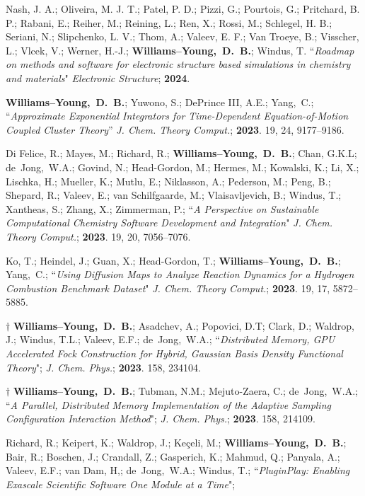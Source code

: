 \documentclass[10pt]{res} %
\newcommand*\me[0]{{\bf Williams--Young,~D.~B.}}
\newcommand*\cy[0]{Yang,~C.}
\newcommand*\bdj[0]{de~Jong,~W.A.}
\begin{document}
\begin{resume}
\begin{etaremune}
        Nash, J. A.; Oliveira, M. J. T.; Patel, P. D.; Pizzi, G.; Pourtois, G.; Pritchard, B. P.; Rabani, E.; 
        Reiher, M.; Reining, L.; Ren, X.; Rossi, M.; Schlegel, H. B.; Seriani, N.; Slipchenko, L. V.; Thom, A.; 
        Valeev, E. F.; Van Troeye, B.; Visscher, L.; Vlcek, V.; Werner, H.-J.; \me; Windus, T.
        ``\emph{Roadmap on methods and software for electronic structure based simulations in chemistry and materials}"
        \emph{Electronic Structure}; \textbf{2024}. 
  \item \me; Yuwono, S.; DePrince III, A.E.; \cy; 
        ``\emph{Approximate Exponential Integrators for Time-Dependent Equation-of-Motion Coupled Cluster Theory}”
	\emph{J. Chem. Theory Comput.}; \textbf{2023}. 19, 24, 9177–9186.
  \item Di Felice, R.; Mayes, M.; Richard, R.; \me; Chan, G.K.L; \bdj; 
        Govind, N.; Head-Gordon, M.; Hermes, M.; Kowalski, K.; Li, X.; Lischka, H.; Mueller, K.; 
	Mutlu, E.; Niklasson, A.; Pederson, M.; Peng, B.; Shepard, R.; Valeev, E.; van Schilfgaarde, M.; 
	Vlaisavljevich, B.; Windus, T.; Xantheas, S.; Zhang, X.; Zimmerman, P.;
	``\emph{A Perspective on Sustainable Computational Chemistry Software Development and Integration}"
	\emph{J. Chem. Theory Comput.}; \textbf{2023}. 19, 20, 7056–7076.
  \item Ko, T.; Heindel, J.; Guan, X.;  Head-Gordon, T.; \me; \cy; 
        ``\emph{Using Diffusion Maps to Analyze Reaction Dynamics for a Hydrogen Combustion Benchmark Dataset}"
        \emph{J. Chem. Theory Comput.}; \textbf{2023}. 19, 17, 5872–5885.
  \item $\dagger$ \me; Asadchev, A.; Popovici, D.T; Clark, D.; Waldrop, J.; Windus, T.L.;
        Valeev, E.F.; \bdj;
        ``\emph{Distributed Memory, GPU Accelerated Fock Construction for Hybrid, Gaussian 
                Basis Density Functional Theory}";
        \emph{J. Chem. Phys.}; \textbf{2023}. 158, 234104.
  \item $\dagger$ \me; Tubman, N.M.; Mejuto-Zaera, C.; \bdj;
        ``\emph{A Parallel, Distributed Memory Implementation of the Adaptive 
                Sampling Configuration Interaction Method}";
        \emph{J. Chem. Phys.}; \textbf{2023}. 158, 214109. 
  \item Richard, R.; Keipert, K.; Waldrop, J.; Keçeli, M.; \me; Bair, R.; Boschen, J.; 
        Crandall, Z.; Gasperich, K.; Mahmud, Q.; Panyala, A.; Valeev, E.F.; van Dam, H,; 
        \bdj; Windus, T.;
       ``\emph{PluginPlay: Enabling Exascale Scientific Software One Module at a Time}";

\end{etaremune}
\end{resume}
\end{document}
